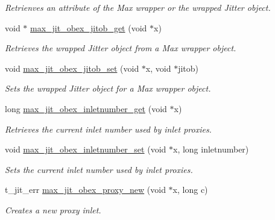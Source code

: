 \begin{DoxyCompactItemize}
\begin{DoxyCompactList}\small\item\em Retrienves an attribute of the Max wrapper or the wrapped Jitter object. \item\end{DoxyCompactList}\item 
void $\ast$ \hyperlink{group__maxwrapmod_ga063ab88bfc92c1a666f3ad6251834e20}{max\_\-jit\_\-obex\_\-jitob\_\-get} (void $\ast$x)
\begin{DoxyCompactList}\small\item\em Retrieves the wrapped Jitter object from a Max wrapper object. \item\end{DoxyCompactList}\item 
void \hyperlink{group__maxwrapmod_gaa1b174cf92680ca46bfb189a812d2a65}{max\_\-jit\_\-obex\_\-jitob\_\-set} (void $\ast$x, void $\ast$jitob)
\begin{DoxyCompactList}\small\item\em Sets the wrapped Jitter object for a Max wrapper object. \item\end{DoxyCompactList}\item 
long \hyperlink{group__maxwrapmod_ga2c0d72889d3a89cbabe1001d55c86c3e}{max\_\-jit\_\-obex\_\-inletnumber\_\-get} (void $\ast$x)
\begin{DoxyCompactList}\small\item\em Retrieves the current inlet number used by inlet proxies. \item\end{DoxyCompactList}\item 
void \hyperlink{group__maxwrapmod_gad00618383afdeb1a45cf7cffd5ee6c9c}{max\_\-jit\_\-obex\_\-inletnumber\_\-set} (void $\ast$x, long inletnumber)
\begin{DoxyCompactList}\small\item\em Sets the current inlet number used by inlet proxies. \item\end{DoxyCompactList}\item 
t\_\-jit\_\-err \hyperlink{group__maxwrapmod_ga010c3e4a11d73d6553b7513719a19b7f}{max\_\-jit\_\-obex\_\-proxy\_\-new} (void $\ast$x, long c)
\begin{DoxyCompactList}\small\item\em Creates a new proxy inlet. \item\end{DoxyCompactList}\item 

\end{DoxyCompactItemize}
